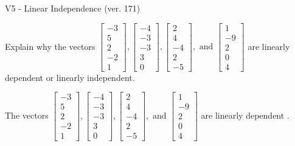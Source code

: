\begin{exercise}
  \begin{exerciseTitle}V5 - Linear Independence (ver. 171)\end{exerciseTitle}
  \begin{exerciseStatement}
    Explain why the vectors \(\left[\begin{array}{r}
-3 \\
5 \\
2 \\
-2 \\
1
\end{array}\right] , \left[\begin{array}{r}
-4 \\
-3 \\
-3 \\
3 \\
0
\end{array}\right] , \left[\begin{array}{r}
2 \\
4 \\
-4 \\
2 \\
-5
\end{array}\right] , \text{ and } \left[\begin{array}{r}
1 \\
-9 \\
2 \\
0 \\
4
\end{array}\right]\) are linearly dependent or linearly independent.	


  \end{exerciseStatement}
  \begin{exerciseAnswer}
   The vectors \(\left[\begin{array}{r}
-3 \\
5 \\
2 \\
-2 \\
1
\end{array}\right] , \left[\begin{array}{r}
-4 \\
-3 \\
-3 \\
3 \\
0
\end{array}\right] , \left[\begin{array}{r}
2 \\
4 \\
-4 \\
2 \\
-5
\end{array}\right] , \text{ and } \left[\begin{array}{r}
1 \\
-9 \\
2 \\
0 \\
4
\end{array}\right]\) are 
  	 linearly dependent  .
  


  \end{exerciseAnswer}
\end{exercise}
